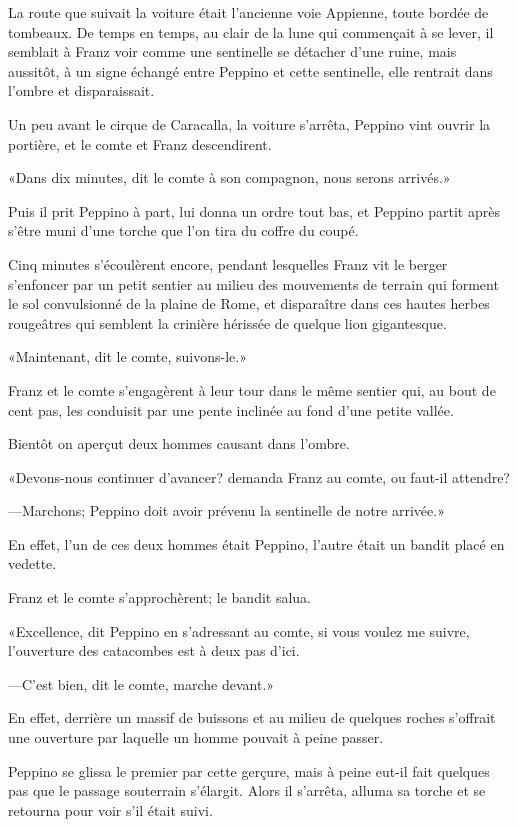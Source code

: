 La route que suivait la voiture était l'ancienne voie Appienne, toute bordée de tombeaux. De temps en temps, au clair de la lune qui commençait à se lever, il semblait à Franz voir comme une sentinelle se détacher d'une ruine, mais aussitôt, à un signe échangé entre Peppino et cette sentinelle, elle rentrait dans l'ombre et disparaissait. 

Un peu avant le cirque de Caracalla, la voiture s'arrêta, Peppino vint ouvrir la portière, et le comte et Franz descendirent. 

«Dans dix minutes, dit le comte à son compagnon, nous serons arrivés.» 

Puis il prit Peppino à part, lui donna un ordre tout bas, et Peppino partit après s'être muni d'une torche que l'on tira du coffre du coupé. 

Cinq minutes s'écoulèrent encore, pendant lesquelles Franz vit le berger s'enfoncer par un petit sentier au milieu des mouvements de terrain qui forment le sol convulsionné de la plaine de Rome, et disparaître dans ces hautes herbes rougeâtres qui semblent la crinière hérissée de quelque lion gigantesque.  

«Maintenant, dit le comte, suivons-le.» 

Franz et le comte s'engagèrent à leur tour dans le même sentier qui, au bout de cent pas, les conduisit par une pente inclinée au fond d'une petite vallée. 

Bientôt on aperçut deux hommes causant dans l'ombre. 

«Devons-nous continuer d'avancer? demanda Franz au comte, ou faut-il attendre? 

—Marchons; Peppino doit avoir prévenu la sentinelle de notre arrivée.» 

En effet, l'un de ces deux hommes était Peppino, l'autre était un bandit placé en vedette. 

Franz et le comte s'approchèrent; le bandit salua. 

«Excellence, dit Peppino en s'adressant au comte, si vous voulez me suivre, l'ouverture des catacombes est à deux pas d'ici. 

—C'est bien, dit le comte, marche devant.» 

En effet, derrière un massif de buissons et au milieu de quelques roches s'offrait une ouverture par laquelle un homme pouvait à peine passer. 

Peppino se glissa le premier par cette gerçure, mais à peine eut-il fait quelques pas que le passage souterrain s'élargit. Alors il s'arrêta, alluma sa torche et se retourna pour voir s'il était suivi. 

